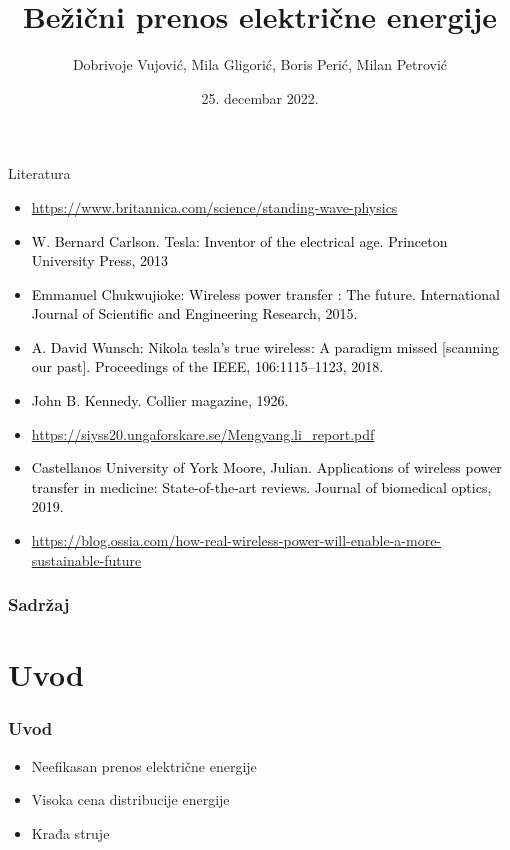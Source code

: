 \documentclass[11pt]{beamer}
\title{Bežični prenos električne energije}
\author{Dobrivoje Vujović, Mila Gligorić, Boris Perić, Milan Petrović}
\institute{Matematički fakultet Univerziteta u Beogradu}
\date{
	\footnotesize{25. decembar 2022.}	
}
\begin{document}
\begin{frame}
	\thispagestyle{empty}
	\titlepage
\end{frame}

\addtocounter{framenumber}{-1}

\begin{frame}{Literatura}
	\begin{itemize}
		
 	\item \textcolor{black}{{\footnotesize}}{\footnotesize \url{https://www.britannica.com/science/standing-wave-physics}}
	\item \textcolor{black}{{\footnotesize W. Bernard Carlson. Tesla: Inventor of the electrical age. Princeton University Press, 2013}}
	\item \textcolor{black}{{\footnotesize Emmanuel Chukwujioke: Wireless power transfer : The future. International Journal of Scientiﬁc and Engineering Research, 2015.}}
	\item \textcolor{black}{{\footnotesize A. David Wunsch:  Nikola tesla’s true wireless: A paradigm missed [scanning our past]. Proceedings of the IEEE, 106:1115–1123, 2018.}}
	\item \textcolor{black}{{\footnotesize John B. Kennedy. Collier magazine, 1926.}}
	\item \textcolor{black}{{\footnotesize}} {\footnotesize \url{https://siyss20.ungaforskare.se/Mengyang.li_report.pdf}}		
	\item \textcolor{black}{{\footnotesize Castellanos University of York Moore, Julian. Applications of wireless power transfer in medicine: State-of-the-art reviews. Journal of biomedical optics, 2019.}}
	\item \textcolor{black}{{\footnotesize}} {\footnotesize \url{https://blog.ossia.com/how-real-wireless-power-will-enable-a-more-sustainable-future}}		
	\end{itemize}
\end{frame}

\begin{frame}
	\frametitle{Sadržaj} %
	\tableofcontents[hidesubsections] 
\end{frame}

\section{Uvod}

\begin{frame}\frametitle{Uvod}
	\begin{itemize}	
		\item Neefikasan prenos električne energije
		\item Visoka cena distribucije energije
		\item Krađa struje
	\end{itemize}
\end{frame}
\end{document}
